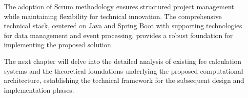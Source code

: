 The adoption of Scrum methodology ensures structured project management while maintaining flexibility for technical innovation. The comprehensive technical stack, centered on Java and Spring Boot with supporting technologies for data management and event processing, provides a robust foundation for implementing the proposed solution.

The next chapter will delve into the detailed analysis of existing fee calculation systems and the theoretical foundations underlying the proposed computational architecture, establishing the technical framework for the subsequent design and implementation phases.